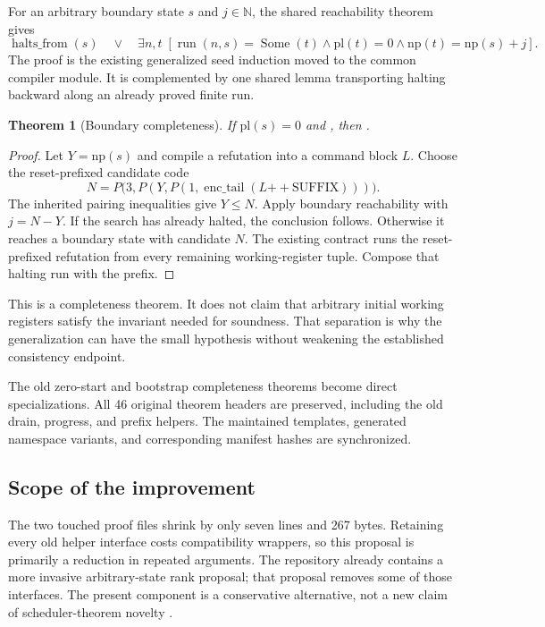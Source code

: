 \documentclass[11pt,letterpaper]{article}
\newtheorem{theorem}{Theorem}[section]
\newcommand{\code}[1]{\texttt{\detokenize{#1}}}
\begin{document}
For an arbitrary boundary state $s$ and $j\in\mathbb N$, the shared reachability
theorem gives
\[
 \operatorname{halts\_from}(s)\quad\lor\quad
 \exists n,t\;[\operatorname{run}(n,s)=\operatorname{Some}(t)
       \land\mathrm{pl}(t)=0\land\mathrm{np}(t)=\mathrm{np}(s)+j].
\]
The proof is the existing generalized seed induction moved to the common compiler
module. It is complemented by one shared lemma transporting halting backward
along an already proved finite run.

\begin{theorem}[Boundary completeness]
If $\mathrm{pl}(s)=0$ and \code{thm222 1}, then
\code{halts_from s}.
\end{theorem}
\begin{proof}
Let $Y=\mathrm{np}(s)$ and compile a refutation into a command block $L$.
Choose the reset-prefixed candidate code
\[
 N=P\bigl(3,P(Y,P(1,\operatorname{enc\_tail}(L\mathbin{+\!+}\mathrm{SUFFIX})))\bigr).
\]
The inherited pairing inequalities give $Y\le N$. Apply boundary reachability
with $j=N-Y$. If the search has already halted, the conclusion follows.
Otherwise it reaches a boundary state with candidate $N$. The existing
\code{program_halts} contract runs the reset-prefixed refutation from every
remaining working-register tuple. Compose that halting run with the prefix.
\end{proof}

This is a completeness theorem. It does not claim that arbitrary initial working
registers satisfy the invariant needed for soundness. That separation is why the
generalization can have the small hypothesis \code{pl seed = 0} without weakening
the established consistency endpoint.

The old zero-start and bootstrap completeness theorems become direct
specializations. All 46 original theorem headers are preserved, including the
old drain, progress, and prefix helpers. The maintained templates, generated
namespace variants, and corresponding manifest hashes are synchronized.

\subsection{Scope of the improvement}

The two touched proof files shrink by only seven lines and 267 bytes. Retaining
every old helper interface costs compatibility wrappers, so this proposal is
primarily a reduction in repeated arguments. The repository already contains
a more invasive arbitrary-state rank proposal; that proposal removes some of
those interfaces. The present component is a conservative alternative, not a
new claim of scheduler-theorem novelty \cite{rank}.
\end{document}
